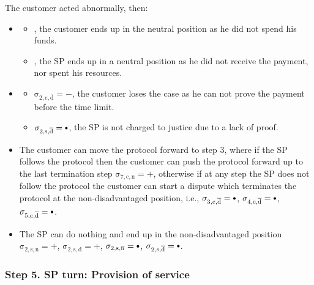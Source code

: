 \documentclass{ieeeaccess}
\newcommand\neutral[1][.75]{\mathbin{\ThisStyle{\vcenter{\hbox{%
  \scalebox{#1}{$\SavedStyle\bullet$}}}}}%
}
\begin{document}
The customer acted abnormally, then:

\begin{itemize}
\item \AgreeablePath
  \begin{itemize}
    \item \Pos{4}{c}{\abnormal}{\neutral}, the customer ends up in the neutral position as he did not spend his funds.
    \item \Pos{4}{s}{\abnormal}{\neutral}, the SP ends up in a neutral position as he did not receive the payment, nor spent his resources.
  \end{itemize}
\item \DisputePath
  \begin{itemize}
    \item \(\operatorname{\sigma_{2, c, \overline{d}} = -}\), the customer loses the case as he can not prove the payment before the time limit.
    \item \(\operatorname{\sigma_{2, s, \overline{d}} = \neutral}\), the SP is not charged to justice due to a lack of proof.
  \end{itemize}
\end{itemize}

\Fairness

\begin{itemize}
  \item The customer can move the protocol forward to step 3, where if the SP follows the protocol then the customer can push the protocol forward up to the last termination step \(\operatorname{\sigma_{7, c, n} = +}\), otherwise if at any step the SP does not follow the protocol the customer can start a dispute which terminates the protocol at the non-disadvantaged position, i.e., \(\operatorname{\sigma_{3, c, \overline{d}} = \neutral}\), \(\operatorname{\sigma_{4, c, \overline{d}} = \neutral}\), \(\operatorname{\sigma_{5, c, \overline{d}} = \neutral}\).
  \item The SP can do nothing and end up in the non-disadvantaged position \(\operatorname{\sigma_{2, s, n} = +}\), \(\operatorname{\sigma_{2, s, d} = +}\), \(\operatorname{\sigma_{2, s, \overline{n}} = \neutral}\), \(\operatorname{\sigma_{2, s, \overline{d}} = \neutral}\).
\end{itemize}

\subsubsection{Step 5. SP turn: Provision of service}
\end{document}
